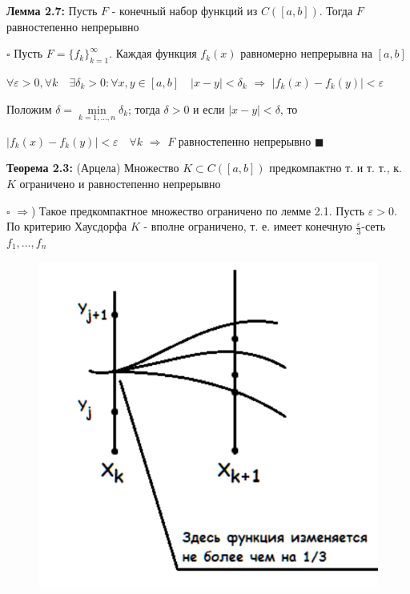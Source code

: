 \documentclass[a4paper]{report}
\begin{document}
\noindent\textbf{Лемма 2.7:} Пусть $F$ - конечный набор функций из $C([a,b])$. Тогда $F$ равностепенно непрерывно

\noindent $\square$ Пусть $F=\{f_k\}_{k=1}^\infty$. Каждая функция $f_k(x)$ равномерно непрерывна на $[a,b]$

$\forall\varepsilon>0,\forall k\quad\exists\delta_k>0\colon\forall x,y\in[a,b]\quad|x-y|<\delta_k$ $\Rightarrow$
$|f_k(x)-f_k(y)|<\varepsilon$

Положим $\delta=\min\limits_{k=1,\ldots,n}\delta_k$; тогда $\delta>0$ и если $|x-y|<\delta$, то

$|f_k(x)-f_k(y)|<\varepsilon\quad\forall k$ $\Rightarrow$ $F$ равностепенно непрерывно $\blacksquare$
\bigskip

\noindent\textbf{Теорема 2.3:} (Арцела) Множество $K\subset C([a,b])$ предкомпактно т. и т. т., к. $K$ ограничено и
равностепенно непрерывно

\noindent $\square$ $\Rightarrow$) Такое предкомпактное множество ограничено по лемме 2.1. Пусть $\varepsilon>0$. По
критерию Хаусдорфа $K$ - вполне ограничено, т. е. имеет конечную $\frac\varepsilon3$-сеть $f_1,\ldots,f_n$

\begin{figure}
\includegraphics[width=\linewidth]{124}
\end{figure}
\end{document}
